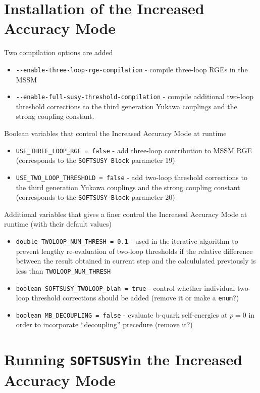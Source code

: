 \documentclass[final,3p,times,pdflatex]{elsarticle}
\def\SOFTSUSY{{\tt SOFTSUSY}}
\def\code#1{\small{\tt #1}\normalsize}
\begin{document}
\appendix

\section{Installation of the Increased Accuracy Mode}
\label{sec:install}

Two compilation options are added
\begin{itemize}
	\item[] \verb|--enable-three-loop-rge-compilation| - compile three-loop RGEs in the MSSM 
	\item[] \verb|--enable-full-susy-threshold-compilation| - compile
          additional two-loop threshold corrections to the third generation
          Yukawa couplings and the strong coupling constant.
\end{itemize}

Boolean variables that control the Increased Accuracy Mode at runtime
\begin{itemize}
	\item \verb|USE_THREE_LOOP_RGE = false|  - add three-loop contribution to MSSM RGE (corresponds to the \code{SOFTSUSY Block} parameter 19)
	\item \verb|USE_TWO_LOOP_THRESHOLD = false| - add two-loop threshold corrections to the third generation Yukawa couplings and the strong coupling constant
(corresponds to the \code{SOFTSUSY Block} parameter 20)
\end{itemize}

Additional variables that gives a finer control the Increased Accuracy Mode at runtime (with their default values)
\begin{itemize}
	\item \verb|double TWOLOOP_NUM_THRESH = 0.1|  - used in the iterative algorithm to prevent lengthy re-evaluation of two-loop thresholds 
		if the relative difference between the result obtained in current step and the  calcululated previously is less than \verb|TWOLOOP_NUM_THRESH| 
	\item \verb|boolean SOFTSUSY_TWOLOOP_blah = true| - control whether individual two-loop threshold corrections should be added (remove it or make a \verb|enum|?)
	\item \verb|boolean MB_DECOUPLING = false| - evaluate b-quark self-energies at $p=0$ in order to incorporate ``decoupling'' precedure (remove it?)
\end{itemize}


\section{Running \SOFTSUSY in the Increased Accuracy Mode} 
\label{sec:run}
\end{document}
